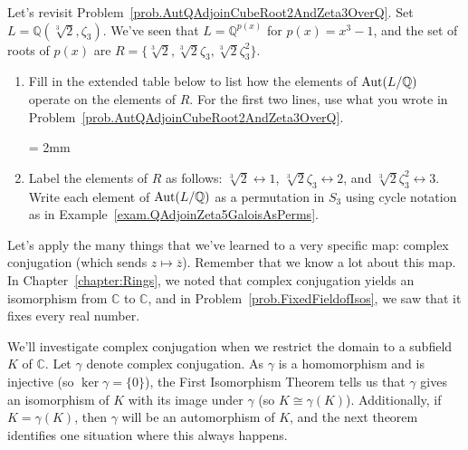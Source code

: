 \begin{problem}\label{prob.AutQAdjoinCubeRoot2AndZeta3OverQAsPerms}
Let's revisit Problem~\ref{prob.AutQAdjoinCubeRoot2AndZeta3OverQ}. Set $L = \mathbb{Q}(\sqrt[3]{2},\zeta_3)$. We've seen that $L = \mathbb{Q}^{p(x)}$ for $p(x) = x^3-1$,  and the set of roots of $p(x)$ are $R=\{\sqrt[3]{2},\sqrt[3]{2}\zeta_3,\sqrt[3]{2}\zeta_3^2\}$. 
\begin{enumerate}
\item Fill in the extended table below to list how the elements of $\operatorname{Aut}(L/\mathbb{Q})$ operate on the elements of $R$. For the first two lines, use what you wrote in Problem~\ref{prob.AutQAdjoinCubeRoot2AndZeta3OverQ}.
\begin{center}
\tabulinesep = 2mm
\end{center}
\item Label the elements of $R$ as follows: $\sqrt[3]{2} \leftrightarrow 1$, $\sqrt[3]{2}\zeta_3 \leftrightarrow 2$, and $\sqrt[3]{2}\zeta_3^2 \leftrightarrow 3$. Write each element of $\operatorname{Aut}(L/\mathbb{Q})$ as a permutation in $S_3$ using cycle notation as in Example~\ref{exam.QAdjoinZeta5GaloisAsPerms}.
\end{enumerate}
\end{problem}

Let's apply the many things that we've learned to a very specific map: complex conjugation (which sends $z\mapsto \overline{z}$). Remember that we know a lot about this map. In Chapter~\ref{chapter:Rings}, we noted that complex conjugation yields an isomorphism from $\mathbb{C}$ to $\mathbb{C}$, and in Problem~\ref{prob.FixedFieldofIsos}, we saw that it fixes every real number. 

We'll investigate complex conjugation when we restrict the domain to a subfield $K$ of $\mathbb{C}$. Let $\gamma$ denote complex conjugation. As $\gamma$ is a homomorphism and is injective (so $\ker \gamma = \{0\}$), the First Isomorphism Theorem tells us that $\gamma$ gives an isomorphism of $K$ with its image under $\gamma$ (so  $K\cong \gamma(K)$). Additionally, if $K= \gamma(K)$, then $\gamma$ will be an automorphism of $K$, and the next theorem identifies one situation where this always happens. 


